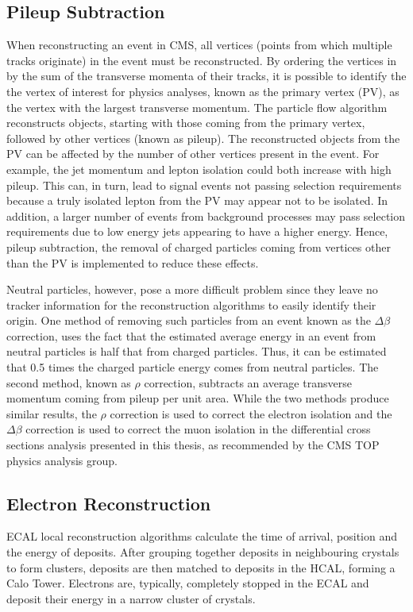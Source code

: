 \subsection{Pileup Subtraction}
\label{ss:pileup_subtraction}
When reconstructing an event in CMS, all vertices (points from which multiple tracks originate) in the event
must be reconstructed. By ordering the vertices in by the sum of the transverse momenta of their tracks, it is
possible to identify the the vertex of interest for physics analyses, known as the primary vertex (PV), as the
vertex with the largest transverse momentum. The particle flow algorithm reconstructs objects, starting with
those coming from the primary vertex, followed by other vertices (known as pileup). The reconstructed objects
from the PV can be affected by the number of other vertices present in the event. For example, the jet
momentum and lepton isolation could both increase with high pileup. This can, in turn, lead to signal events
not passing selection requirements because a truly isolated lepton from the PV may appear not to be isolated.
In addition, a larger number of events from background processes may pass selection requirements due to low
energy jets appearing to have a higher energy. Hence, pileup subtraction, the removal of charged particles
coming from vertices other than the PV is implemented to reduce these effects.

Neutral particles, however, pose a more difficult problem since they leave no tracker information for the
reconstruction algorithms to easily identify their origin. One method of removing such particles from an event
known as the $\Delta\beta$ correction, uses the fact that the estimated average energy in an event from
neutral particles is half that from charged particles. Thus, it can be estimated that 0.5 times the charged particle
energy comes from neutral particles. The second method, known as $\rho$ correction, subtracts an average
transverse momentum coming from pileup per unit area. While the two methods produce similar results, the
$\rho$ correction is used to correct the electron isolation and the $\Delta\beta$ correction is used to correct the
muon isolation in the differential cross sections analysis presented in this thesis, as recommended by the CMS
TOP physics analysis group.

\subsection{Electron Reconstruction}
\label{ss:electron_reconstruction}
ECAL local reconstruction algorithms calculate the time of arrival, position and the energy of deposits. After
grouping together deposits in neighbouring crystals to form clusters, deposits are then matched to deposits in
the HCAL, forming a Calo Tower. Electrons are, typically, completely stopped in the ECAL and deposit their
energy in a narrow cluster of crystals.

